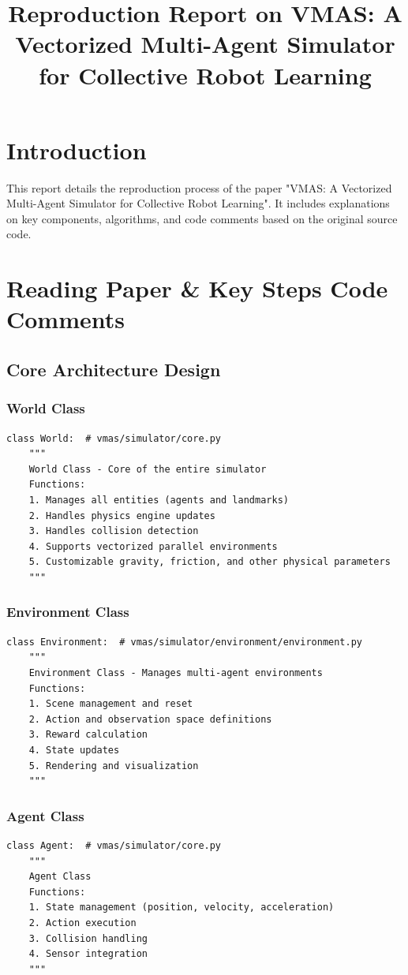 \documentclass[12pt]{article}
\title{Reproduction Report on VMAS: A Vectorized Multi-Agent Simulator for Collective Robot Learning}
\author{}
\date{}
\begin{document}
\maketitle

\section{Introduction}
This report details the reproduction process of the paper "VMAS: A Vectorized Multi-Agent Simulator for Collective Robot Learning". It includes explanations on key components, algorithms, and code comments based on the original source code.

\section{Reading Paper \& Key Steps Code Comments}

\subsection{Core Architecture Design}

\subsubsection{World Class}
\begin{verbatim}
class World:  # vmas/simulator/core.py
    """
    World Class - Core of the entire simulator
    Functions:
    1. Manages all entities (agents and landmarks)
    2. Handles physics engine updates
    3. Handles collision detection
    4. Supports vectorized parallel environments
    5. Customizable gravity, friction, and other physical parameters
    """
\end{verbatim}

\subsubsection{Environment Class}
\begin{verbatim}
class Environment:  # vmas/simulator/environment/environment.py
    """
    Environment Class - Manages multi-agent environments
    Functions:
    1. Scene management and reset
    2. Action and observation space definitions
    3. Reward calculation
    4. State updates
    5. Rendering and visualization
    """
\end{verbatim}

\subsubsection{Agent Class}
\begin{verbatim}
class Agent:  # vmas/simulator/core.py
    """
    Agent Class
    Functions:
    1. State management (position, velocity, acceleration)
    2. Action execution
    3. Collision handling
    4. Sensor integration
    """
\end{verbatim}
\end{document}
